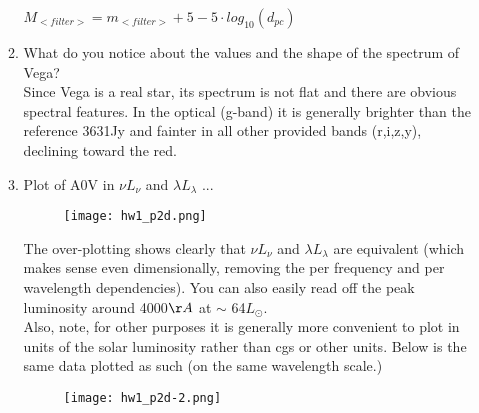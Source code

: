 \documentclass[11pt]{article}
\begin{document}
\begin{enumerate}
\begin{enumerate}
			 \hspace{10mm} $M_{<filter>} = m_{<filter>} + 5 -5 \cdot log_{10}(d_{pc})$\\
		 	 
	   
	 \item What do you notice about the values and the shape of the spectrum of Vega?\\	 
	 
	 Since Vega is a real star, its spectrum is not flat and there are obvious spectral features. In the optical (g-band) it is generally brighter than the reference 3631Jy and fainter in all other provided bands (r,i,z,y), declining toward the red.\\
	 
	 \item Plot of A0V in $\nu$$L_{\nu}$ and $\lambda$$L_{\lambda}$ ...
	 
	 \begin{figure}[H]
		 \texttt{[image: hw1\_p2d.png]}
	     \label{fig:fig2}
	  \end{figure}
	  
	
	The over-plotting shows clearly that $\nu$$L_{\nu}$ and $\lambda$$L_{\lambda}$ are equivalent (which makes sense even dimensionally, removing the per frequency and per wavelength dependencies). You can also easily read off the peak luminosity around 4000$\AA$ at $\sim$ 64$L_{\odot}$.\\
	
	Also, note, for other purposes it is generally more convenient to plot in units of the solar luminosity rather than cgs or other units. Below is the same data plotted as such (on the same wavelength scale.)\\
	
	\begin{figure}[H]
		\texttt{[image: hw1\_p2d-2.png]}
		\label{fig:fig3}
	\end{figure}
	  
	     
  \end{enumerate}
\end{enumerate}
\end{document}
